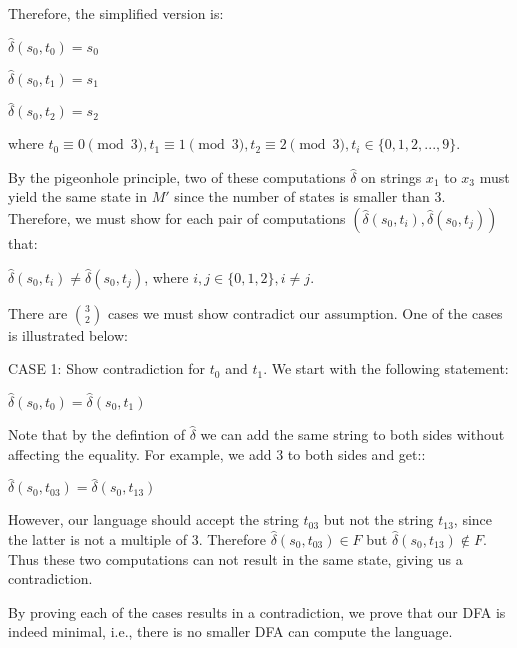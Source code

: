 \documentclass{article}
\begin{document}
Therefore, the simplified version is:

\begin{center}
$\hat{\delta}(s_0, t_0) = s_0$

$\hat{\delta}(s_0, t_1) = s_1$

$\hat{\delta}(s_0, t_2) = s_2$

where $t_0 \equiv 0 \pmod 3, t_1 \equiv 1 \pmod 3, t_2 \equiv 2 \pmod 3, t_i \in \{0,1,2,...,9\}$.
\end{center}

By the pigeonhole principle, two of these computations $\hat{\delta}$ on strings $x_1$ to $x_3$ must yield the same state in $M'$ since the number of states is smaller than 3. Therefore, we must show for each pair of computations $(\hat{\delta}(s_0,t_i),\hat{\delta}(s_0,t_j))$ that:

\begin{center}
$\hat{\delta}(s_0,t_i) \not = \hat{\delta}(s_0,t_j)$, where $i, j \in \{0, 1, 2\}, i\not = j$.
\end{center}

There are ${3 \choose 2}$ cases we must show contradict our assumption. One of the cases is illustrated below:

CASE 1: Show contradiction for $t_0$ and $t_1$. We start with the following statement:

\begin{center}
$\hat{\delta}(s_0,t_0)  = \hat{\delta}(s_0,t_1)$
\end{center}

Note that by the defintion of $\hat{\delta}$ we can add the same string to both sides without affecting the equality. For example,  we add 3 to both sides and get::

\begin{center}
$\hat{\delta}(s_0,t_03)  = \hat{\delta}(s_0,t_13)$
\end{center}

However, our language should accept the string $t_03$ but not the string $t_13$, since the latter is not a multiple of 3. Therefore $\hat{\delta}(s_0,t_03) \in F $ but $\hat{\delta}(s_0,t_13) \not \in F$. Thus these two computations can not result in the same state, giving us a contradiction.

By proving each of the cases results in a contradiction, we prove that our DFA is indeed minimal, i.e., there is no smaller DFA can compute the language.
\end{document}

